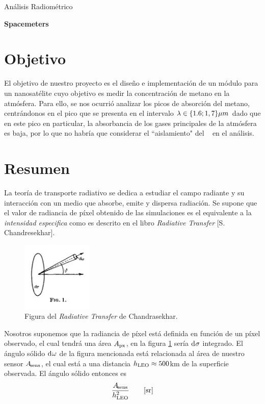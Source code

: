 \documentclass[titlepage,11pt]{article}
\begin{document}
{
\centering
{\Huge Análisis Radiométrico \par}
\vspace{.4cm}
{\bf Spacemeters \par}
\vspace{.5cm}
}
\section{Objetivo}

El objetivo de nuestro proyecto es el diseño e implementación de un m\'odulo para un nanosatélite cuyo objetivo es medir la concentración de metano en la atmósfera. Para ello, se nos ocurrió analizar los picos de absorción del metano, centrándonos en el pico que se presenta en el intervalo $\lambda\in \{1.6 ; 1,7\} \micro m$ dado que en este pico en particular, la absorbancia de los gases principales de la atmósfera es baja, por lo que no habría que considerar el ``aislamiento"{} del \metano~ en el análisis. 

\section{Resumen}
La teoría de transporte radiativo se dedica a estudiar el campo radiante y su interacción con un medio que absorbe, emite y dispersa radiación. Se supone que el valor de radiancia de píxel obtenido de las simulaciones es el equivalente a la \textit{intensidad especifica} como es descrito en el libro \textit{Radiative Transfer} [S. Chandresekhar].

\begin{figure}[htb!]
    \centering
    \includegraphics[width=0.3\textwidth]{fig/chandra.png}
    \caption{Figura del \textit{Radiative Transfer} de Chandrasekhar. }
    \label{fig:chandra}
\end{figure}
Nosotros suponemos que la radiancia de píxel está definida en función de un píxel observado, el cual tendrá una área $A_\px$, en la figura \ref{fig:chandra} sería $\diff\sigma$ integrado. El ángulo sólido $\diff\omega$ de la figura mencionada está relacionada al área de nuestro sensor $A_\sensor$, el cual está a una distancia $h_\LEO\approx 500$km de la superficie observada. El ángulo sólido entonces es
\[
\frac{A_\sensor}{h_\LEO^2}\qquad [\text{sr}]
\]
\end{document}
